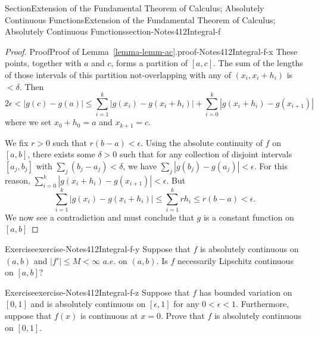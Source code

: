 \documentclass[oneside,10pt,]{article}
\newcommand{\xreffont}{\relax}
\numberwithin{equation}{section}
\begin{document}
\begin{sectionptx}{Section}{Extension of the Fundamental Theorem of Calculus; Absolutely Continuous Functions}{}{Extension of the Fundamental Theorem of Calculus; Absolutely Continuous Functions}{}{}{section-Notes412Integral-f}
\begin{proof}{Proof}{Proof of Lemma~{\xreffont\ref*{lemma-lemm-ac}}.}{proof-Notes412Integral-f-x}
These points, together with \(a \) and \(c\), forms a partition of \([a, c]\). The sum of the lengths of those intervals of this partition not-overlapping with any of \((x_{i}, x_{i}+h_{i})\) is \(< \delta\). Then%
\begin{equation*}
2\epsilon < |g(c)-g(a)| \le \sum_{i=1}^{k} |g(x_{i})-g(x_{i}+h_{i})| + \sum_{i=0}^{k} |g(x_{i}+h_{i})-g(x_{i+1})|
\end{equation*}
where we set \(x_{0}+h_{0}=a\) and \(x_{k+1}=c\).%
\par
We fix \(r > 0\) such that \(r(b-a) < \epsilon\). Using the absolute continuity of \(f\) on \([a, b]\), there exists some \(\delta > 0\) such that for any collection of disjoint intervals \([a_{j}, b_{j}]\) with \(\sum_{j} (b_{j}-a_{j}) < \delta\), we have \(\sum_{j}|g(b_{j})-g(a_{j})| < \epsilon\). For this reason, \(\sum_{i=0}^{k} |g(x_{i}+h_{i})-g(x_{i+1})| < \epsilon\). But%
\begin{equation*}
\sum_{i=1}^{k} |g(x_{i})-g(x_{i}+h_{i})| \le \sum_{i=1}^{k}r h_{i} \le r(b-a) < \epsilon.
\end{equation*}
We now see a contradiction and must conclude that \(g\) is a constant function on \([a, b]\)%
\end{proof}
\begin{inlineexercise}{Exercise}{}{exercise-Notes412Integral-f-y}%
Suppose that  \(f\) is absolutely continuous on  \((a, b)\) and \(|f'|\le M < \infty\) \(a.e.\) on \((a, b)\). Is \(f\) necessarily Lipschitz continuous on \([a, b]\)?%
\end{inlineexercise}%
\begin{inlineexercise}{Exercise}{}{exercise-Notes412Integral-f-z}%
Suppose that  \(f\) has bounded variation on \([0, 1]\) and is absolutely continuous on  \([\epsilon ,1]\) for any \(0 < \epsilon < 1\). Furthermore, suppose that \(f(x)\) is continuous at \(x=0\). Prove that \(f\) is absolutely continuous on  \([0 ,1]\).%
\end{inlineexercise}%
\end{sectionptx}
\end{document}
